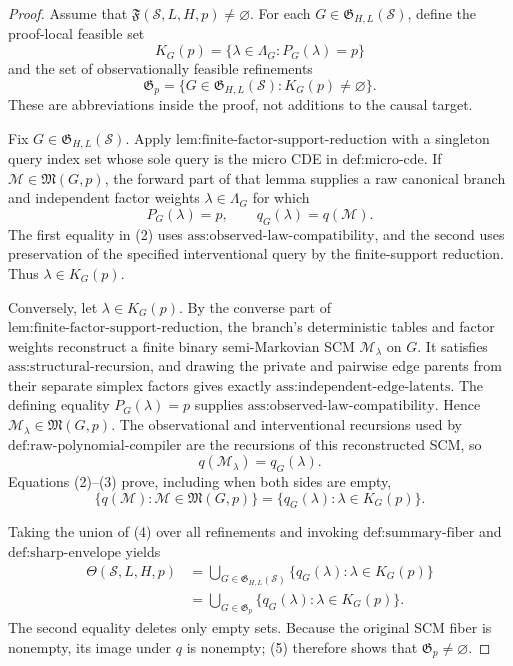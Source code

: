 \documentclass{article}
\begin{document}
\begin{proof}
Assume that \(\mathfrak F(\mathcal S,L,H,p)\ne\varnothing\).  For each \(G\in\mathfrak G_{H,L}(\mathcal S)\), define the proof-local feasible set
\[
K_G(p)=\{\lambda\in\Lambda_G:P_G(\lambda)=p\}
\]
and the set of observationally feasible refinements
\[
\mathfrak G_p=\{G\in\mathfrak G_{H,L}(\mathcal S):K_G(p)\ne\varnothing\}.
\tag{1}
\]
These are abbreviations inside the proof, not additions to the causal target.

Fix \(G\in\mathfrak G_{H,L}(\mathcal S)\).  Apply \(\text{lem:finite-factor-support-reduction}\) with a singleton query index set whose sole query is the micro CDE in \(\text{def:micro-cde}\).  If \(\mathcal M\in\mathfrak M(G,p)\), the forward part of that lemma supplies a raw canonical branch and independent factor weights \(\lambda\in\Lambda_G\) for which
\[
P_G(\lambda)=p,
\qquad
q_G(\lambda)=q(\mathcal M).
\tag{2}
\]
The first equality in (2) uses \(\text{ass:observed-law-compatibility}\), and the second uses preservation of the specified interventional query by the finite-support reduction.  Thus \(\lambda\in K_G(p)\).

Conversely, let \(\lambda\in K_G(p)\).  By the converse part of \(\text{lem:finite-factor-support-reduction}\), the branch's deterministic tables and factor weights reconstruct a finite binary semi-Markovian SCM \(\mathcal M_\lambda\) on \(G\).  It satisfies \(\text{ass:structural-recursion}\), and drawing the private and pairwise edge parents from their separate simplex factors gives exactly \(\text{ass:independent-edge-latents}\).  The defining equality \(P_G(\lambda)=p\) supplies \(\text{ass:observed-law-compatibility}\).  Hence \(\mathcal M_\lambda\in\mathfrak M(G,p)\).  The observational and interventional recursions used by \(\text{def:raw-polynomial-compiler}\) are the recursions of this reconstructed SCM, so
\[
q(\mathcal M_\lambda)=q_G(\lambda).
\tag{3}
\]
Equations (2)--(3) prove, including when both sides are empty,
\[
\{q(\mathcal M):\mathcal M\in\mathfrak M(G,p)\}
=\{q_G(\lambda):\lambda\in K_G(p)\}.
\tag{4}
\]

Taking the union of (4) over all refinements and invoking \(\text{def:summary-fiber}\) and \(\text{def:sharp-envelope}\) yields
\[
\begin{aligned}
\Theta(\mathcal S,L,H,p)
&=\bigcup_{G\in\mathfrak G_{H,L}(\mathcal S)}
  \{q_G(\lambda):\lambda\in K_G(p)\}\\
&=\bigcup_{G\in\mathfrak G_p}
  \{q_G(\lambda):\lambda\in K_G(p)\}.
\end{aligned}
\tag{5}
\]
The second equality deletes only empty sets.  Because the original SCM fiber is nonempty, its image under \(q\) is nonempty; (5) therefore shows that \(\mathfrak G_p\ne\varnothing\).


\end{proof}
\end{document}
